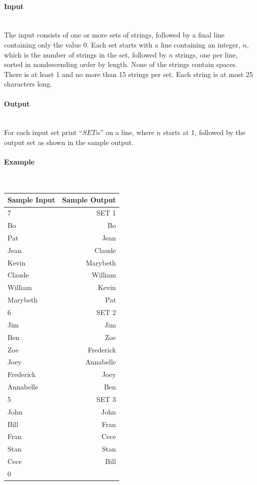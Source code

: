 \documentclass{article}
\begin{document}
\paragraph{Input} \mbox{} \\

The input consists of one or more sets of strings, followed by a final line containing only the
value 0. Each set starts with a line containing an integer, $n$, which is the number of strings in
the set, followed by $n$ strings, one per line, sorted in nondescending order by length. None of the
strings contain spaces. There is at least 1 and no more than 15 strings per set. Each string is at most
25 characters long.

\paragraph{Output}\mbox{} \\
For each input set print $“SET n”$ on a line, where $n$ starts at 1, followed by the output set as shown
in the sample output.

\paragraph{Example}\mbox{} \\

\begin{table}[h]
    \centering
    \begin{tabular}{|l|r|}
        \hline
        \textbf{Sample Input} & \textbf{Sample Output} \\
        \hline
		7& SET 1 \\ 
		Bo& Bo \\ 
		Pat&Jean  \\ 
		Jean&Claude  \\ 
		Kevin&Marybeth  \\
		Claude&William  \\ 
		William&Kevin  \\ 
		Marybeth&Pat  \\ 
		6&SET 2  \\ 
		Jim&Jim  \\ 
		Ben&Zoe  \\ 
		Zoe& Frederick \\
		Joey&Annabelle  \\
		Frederick&Joey  \\
		Annabelle&Ben  \\
		5&SET 3  \\
		John&John  \\
		Bill&Fran  \\
		Fran&Cece  \\
		Stan&Stan  \\
		Cece&Bill  \\
		0  & \\ \hline
    \end{tabular}
\end{table}
\end{document}
